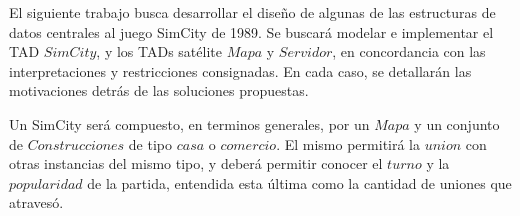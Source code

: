 \vspace{6ex}
\vspace{2ex}

El siguiente trabajo busca desarrollar el diseño de algunas de las estructuras de datos centrales al juego SimCity de 1989. Se buscará modelar e implementar el TAD $SimCity$, y los TADs satélite $Mapa$ y $Servidor$, en concordancia con las interpretaciones y restricciones consignadas. En cada caso, se detallarán las motivaciones detrás de las soluciones propuestas. 

Un SimCity será compuesto, en terminos generales, por un $Mapa$ y un conjunto de $Construcciones$ de tipo $casa$ o $comercio$. El mismo permitirá la $union$ con otras instancias del mismo tipo, y deberá permitir conocer el $turno$ y la $popularidad$ de la partida, entendida esta última como la cantidad de uniones que atravesó. 